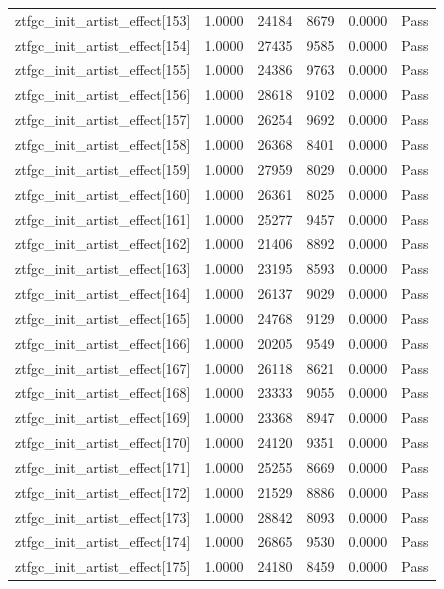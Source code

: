 \begin{table}[htbp]
\begin{tabular}{llrrll}
ztfgc\_init\_artist\_effect[153] & 1.0000 & 24184 & 8679 & 0.0000 & Pass \\
ztfgc\_init\_artist\_effect[154] & 1.0000 & 27435 & 9585 & 0.0000 & Pass \\
ztfgc\_init\_artist\_effect[155] & 1.0000 & 24386 & 9763 & 0.0000 & Pass \\
ztfgc\_init\_artist\_effect[156] & 1.0000 & 28618 & 9102 & 0.0000 & Pass \\
ztfgc\_init\_artist\_effect[157] & 1.0000 & 26254 & 9692 & 0.0000 & Pass \\
ztfgc\_init\_artist\_effect[158] & 1.0000 & 26368 & 8401 & 0.0000 & Pass \\
ztfgc\_init\_artist\_effect[159] & 1.0000 & 27959 & 8029 & 0.0000 & Pass \\
ztfgc\_init\_artist\_effect[160] & 1.0000 & 26361 & 8025 & 0.0000 & Pass \\
ztfgc\_init\_artist\_effect[161] & 1.0000 & 25277 & 9457 & 0.0000 & Pass \\
ztfgc\_init\_artist\_effect[162] & 1.0000 & 21406 & 8892 & 0.0000 & Pass \\
ztfgc\_init\_artist\_effect[163] & 1.0000 & 23195 & 8593 & 0.0000 & Pass \\
ztfgc\_init\_artist\_effect[164] & 1.0000 & 26137 & 9029 & 0.0000 & Pass \\
ztfgc\_init\_artist\_effect[165] & 1.0000 & 24768 & 9129 & 0.0000 & Pass \\
ztfgc\_init\_artist\_effect[166] & 1.0000 & 20205 & 9549 & 0.0000 & Pass \\
ztfgc\_init\_artist\_effect[167] & 1.0000 & 26118 & 8621 & 0.0000 & Pass \\
ztfgc\_init\_artist\_effect[168] & 1.0000 & 23333 & 9055 & 0.0000 & Pass \\
ztfgc\_init\_artist\_effect[169] & 1.0000 & 23368 & 8947 & 0.0000 & Pass \\
ztfgc\_init\_artist\_effect[170] & 1.0000 & 24120 & 9351 & 0.0000 & Pass \\
ztfgc\_init\_artist\_effect[171] & 1.0000 & 25255 & 8669 & 0.0000 & Pass \\
ztfgc\_init\_artist\_effect[172] & 1.0000 & 21529 & 8886 & 0.0000 & Pass \\
ztfgc\_init\_artist\_effect[173] & 1.0000 & 28842 & 8093 & 0.0000 & Pass \\
ztfgc\_init\_artist\_effect[174] & 1.0000 & 26865 & 9530 & 0.0000 & Pass \\
ztfgc\_init\_artist\_effect[175] & 1.0000 & 24180 & 8459 & 0.0000 & Pass \\

\end{tabular}
\end{table}
